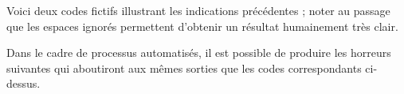 \documentclass[10pt, a4paper]{article}
\begin{document}


Voici deux codes fictifs illustrant les indications précédentes ; noter au passage que les espaces ignorés permettent d'obtenir un résultat humainement très clair.
\begin{multicols}{2}

\end{multicols}

Dans le cadre de processus automatisés, il est possible de produire les horreurs suivantes qui aboutiront aux mêmes sorties que les codes correspondants ci-dessus.
\begin{multicols}{2}

\end{multicols}
\end{document}
